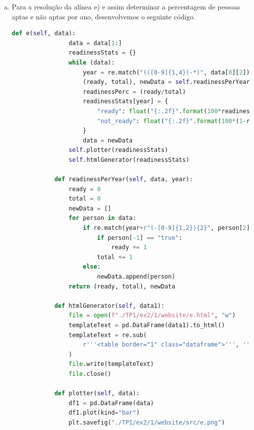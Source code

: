 \documentclass[11pt,a4paper]{report}%
\begin{document}
\begin{enumerate}
\begin{enumerate}[a)]
\begin{lstlisting}[language=python]
			def plotter(self, data):
				if len(data) >= 50:
					df1 = pd.DataFrame(data, index=[""])
					df1.plot(kind="bar")
					plt.savefig("./TP1/ex2/1/website/src/d.png")
				else:
					df1 = pd.DataFrame(data, index=[""])
					df1.plot(kind="bar")
					plt.savefig("./TP1/ex2/1/website/src/d.png")
		\end{lstlisting}
	
		Criamos a função auxiliar "distByAddress" que começa por criar um dicionário onde vão ser guardadas as informaçõe, vai percorrer cada pessoa do ficheiro, adicionar ao dicionário a sua morada caso esta não exista e incrementar o número de pessoas que vivem nessa morada.
		
		\newpage
		
		\item Para a resolução da alínea e) e assim determinar a percentagem de pessoas aptas e não aptas por ano, desenvolvemos o seguinte código.
		\begin{lstlisting}[language=python]
			def e(self, data):
				data = data[1:]
				readinessStats = {}
				while (data):
					year = re.match("(([0-9]{1,4})-*)", data[0][2]).group(2)
					(ready, total), newData = self.readinessPerYear(data, year)
					readinessPerc = (ready/total)
					readinessStats[year] = {
						"ready": float("{:.2f}".format(100*readinessPerc)),
						"not_ready": float("{:.2f}".format(100*(1-readinessPerc)))
					}
					data = newData
				self.plotter(readinessStats)
				self.htmlGenerator(readinessStats)
			
			def readinessPerYear(self, data, year):
				ready = 0
				total = 0
				newData = []
				for person in data:
					if re.match(year+r"(-[0-9]{1,2}){2}", person[2]):
						if person[-1] == "true":
							ready += 1
						total += 1
					else:
						newData.append(person)
				return (ready, total), newData
			
			def htmlGenerator(self, data1):
				file = open(f"./TP1/ex2/1/website/e.html", "w")
				templateText = pd.DataFrame(data1).to_html()
				templateText = re.sub(
					r'''<table border="1" class="dataframe">''', '''<p class="title">Percentagem de aptos e não aptos por ano</p>\n<div class="images" style="padding-bottom: 2rem;"><img src="./src/e.png" alt="">\n</div>\n<link rel="stylesheet" href="main.css">\n<table border="1" class="dataframe">''', templateText
				)
				file.write(templateText)
				file.close()
			
			def plotter(self, data):
				df1 = pd.DataFrame(data)
				df1.plot(kind="bar")
				plt.savefig("./TP1/ex2/1/website/src/e.png")
		\end{lstlisting}
	

\end{enumerate}
\end{enumerate}
\end{document}
